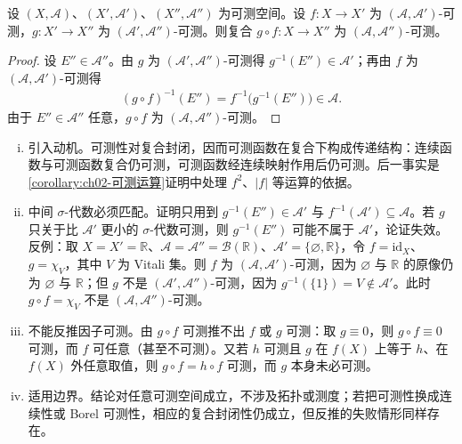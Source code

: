 \documentclass[../../main.tex]{subfiles}%
\begin{document}
\begin{proposition}\label{proposition:ch02-复合可测}
设 $(X,\mathscr A)$、$(X',\mathscr A')$、$(X'',\mathscr A'')$ 为可测空间。设 $f:X\to X'$ 为 $(\mathscr A,\mathscr A')$-可测，$g:X'\to X''$ 为 $(\mathscr A',\mathscr A'')$-可测。则复合 $g\circ f:X\to X''$ 为 $(\mathscr A,\mathscr A'')$-可测。
\end{proposition}

\begin{proof}
设 $E''\in\mathscr A''$。由 $g$ 为 $(\mathscr A',\mathscr A'')$-可测得 $g^{-1}(E'')\in\mathscr A'$；再由 $f$ 为 $(\mathscr A,\mathscr A')$-可测得
\begin{align*}
(g\circ f)^{-1}(E'')=f^{-1}\bigl(g^{-1}(E'')\bigr)\in\mathscr A.
\end{align*}
由于 $E''\in\mathscr A''$ 任意，$g\circ f$ 为 $(\mathscr A,\mathscr A'')$-可测。
\end{proof}

\begin{remark}\label{remark:ch02-复合可测}
\begin{enumerate}[(i)]
\item 引入动机。可测性对复合封闭，因而可测函数在复合下构成传递结构：连续函数与可测函数复合仍可测，可测函数经连续映射作用后仍可测。后一事实是\cref{corollary:ch02-可测运算}证明中处理 $f^2$、$|f|$ 等运算的依据。
\item 中间 $\sigma$-代数必须匹配。证明只用到 $g^{-1}(E'')\in\mathscr A'$ 与 $f^{-1}(\mathscr A')\subseteq\mathscr A$。若 $g$ 只关于比 $\mathscr A'$ 更小的 $\sigma$-代数可测，则 $g^{-1}(E'')$ 可能不属于 $\mathscr A'$，论证失效。反例：取 $X=X'=\mathbb{R}$、$\mathscr A=\mathscr A''=\mathscr B(\mathbb{R})$、$\mathscr A'=\{\varnothing,\mathbb{R}\}$，令 $f=\mathrm{id}_X$、$g=\chi_V$，其中 $V$ 为 Vitali 集。则 $f$ 为 $(\mathscr A,\mathscr A')$-可测，因为 $\varnothing$ 与 $\mathbb{R}$ 的原像仍为 $\varnothing$ 与 $\mathbb{R}$；但 $g$ 不是 $(\mathscr A',\mathscr A'')$-可测，因为 $g^{-1}(\{1\})=V\notin\mathscr A'$。此时 $g\circ f=\chi_V$ 不是 $(\mathscr A,\mathscr A'')$-可测。
\item 不能反推因子可测。由 $g\circ f$ 可测推不出 $f$ 或 $g$ 可测：取 $g\equiv0$，则 $g\circ f\equiv0$ 可测，而 $f$ 可任意（甚至不可测）。又若 $h$ 可测且 $g$ 在 $f(X)$ 上等于 $h$、在 $f(X)$ 外任意取值，则 $g\circ f=h\circ f$ 可测，而 $g$ 本身未必可测。
\item 适用边界。结论对任意可测空间成立，不涉及拓扑或测度；若把可测性换成连续性或 Borel 可测性，相应的复合封闭性仍成立，但反推的失败情形同样存在。
\end{enumerate}
\end{remark}
\end{document}

